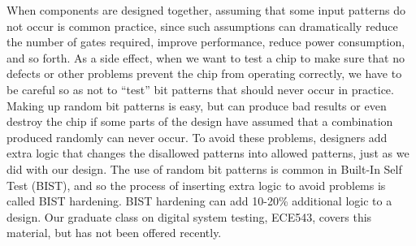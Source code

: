 When components are designed together, assuming that some input patterns
do not occur is common practice, since such assumptions can dramatically
reduce the number of gates required, improve performance, reduce power
consumption, and so forth.  As a side effect, when we want to test a
chip to make sure that no defects or other problems prevent the chip
from operating correctly, we have to be careful so as not to ``test''
bit patterns that should never occur in practice.  Making up random bit
patterns is easy, but can produce bad results or even destroy the chip
if some parts of the design have assumed that a combination produced 
randomly can never occur.  To avoid these problems, designers add extra
logic that changes the disallowed patterns into allowed patterns, just
as we did with our design.  The use of random bit patterns is common in
Built-In Self Test (BIST), and so the process of inserting extra logic
to avoid problems is called BIST hardening.  BIST hardening can add
\mbox{10-20\%} additional logic to a design.
%
Our graduate class on digital system testing, ECE543, covers this
material, but has not been offered recently.

\vfill

\pagebreak

